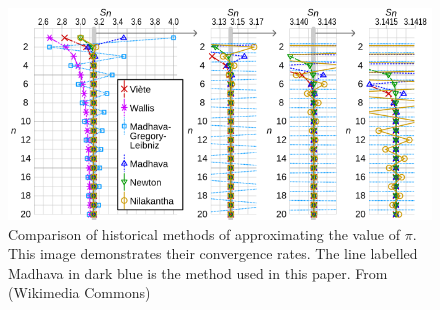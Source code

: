 \begin{figure}[h]
    \includegraphics[width=\linewidth]{image.png}
    \caption{Comparison of historical methods of approximating the value of $\pi$. This image demonstrates
    their convergence rates. The line labelled Madhava in dark blue is the method used in this paper. 
    From (Wikimedia Commons) \cite{infinite_series_comparaison}}
    \label{fig:comparaison}
  \end{figure}
